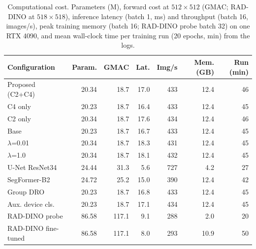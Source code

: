 \documentclass{ieeeaccess}
\begin{document}
\begin{table}[!t]
\centering\scriptsize
\setlength{\tabcolsep}{2.5pt}
\caption{Computational cost. Parameters (M), forward cost at $512\times512$ (GMAC; RAD-DINO at $518\times518$), inference latency (batch 1, ms) and throughput (batch 16, images/s), peak training memory (batch 16; RAD-DINO probe batch 32) on one RTX 4090, and mean wall-clock time per training run (20 epochs, min) from the logs.}
\label{tab:complexity}
\begin{tabular}{@{}lrrrrrr@{}}
\toprule
Configuration & Param. & GMAC & Lat. & Img/s & Mem. (GB) & Run (min) \\
\midrule
Proposed (C2+C4) & 20.34 & 18.7 & 17.0 & 433 & 12.4 & 46 \\
C4 only & 20.23 & 18.7 & 16.4 & 433 & 12.4 & 45 \\
C2 only & 20.34 & 18.7 & 17.6 & 434 & 12.4 & 46 \\
Base & 20.23 & 18.7 & 16.7 & 433 & 12.4 & 45 \\
$\lambda$=0.01 & 20.34 & 18.7 & 18.3 & 431 & 12.4 & 45 \\
$\lambda$=1.0 & 20.34 & 18.7 & 18.1 & 432 & 12.4 & 45 \\
U-Net ResNet34 & 24.44 & 31.3 & 5.6 & 727 & 4.2 & 27 \\
SegFormer-B2 & 24.72 & 25.2 & 15.0 & 390 & 12.4 & 42 \\
Group DRO & 20.23 & 18.7 & 16.8 & 433 & 12.4 & 45 \\
Aux. device cls. & 20.23 & 18.7 & 17.1 & 434 & 12.4 & 45 \\
RAD-DINO probe & 86.58 & 117.1 & 9.1 & 288 & 2.0 & 20 \\
RAD-DINO fine-tuned & 86.58 & 117.1 & 8.0 & 293 & 10.9 & 50 \\
\bottomrule
\end{tabular}
\end{table}
\end{document}
